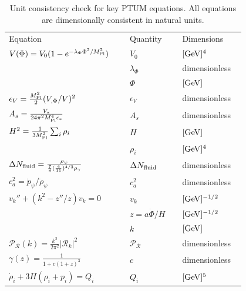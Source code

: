 \documentclass[epj]{svjour}
\begin{document}
\begin{table}[htbp]
\caption{Unit consistency check for key PTUM equations. All
equations are dimensionally consistent in natural units.}
\label{tab:units}
\centering
\footnotesize
\begin{tabular}{@{}>{\raggedright\arraybackslash}p{0.46\linewidth}>{\raggedright\arraybackslash}p{0.20\linewidth}>{\raggedright\arraybackslash}p{0.24\linewidth}@{}}
\hline\noalign{\smallskip}
Equation & Quantity & Dimensions \\
\noalign{\smallskip}\hline\noalign{\smallskip}
\(V(\Phi) = V_0(1-e^{-\lambda_\Phi\Phi^2/M_{\rm Pl}^2})\) & \(V_0\) & \([{\rm GeV}]^4\) \\
& \(\lambda_\Phi\) & dimensionless \\
& \(\Phi\) & \([{\rm GeV}]\) \\
\noalign{\smallskip}\hline\noalign{\smallskip}
\(\epsilon_V = \frac{M_{\rm Pl}^2}{2}(V_{,\Phi}/V)^2\) & \(\epsilon_V\) & dimensionless \\
\noalign{\smallskip}\hline\noalign{\smallskip}
\(A_s = \frac{V_*}{24\pi^2 M_{\rm Pl}^4 \epsilon_*}\) & \(A_s\) & dimensionless \\
\noalign{\smallskip}\hline\noalign{\smallskip}
\(H^2 = \frac{1}{3M_{\rm Pl}^2}\sum_i \rho_i\) & \(H\) & \([{\rm GeV}]\) \\
& \(\rho_i\) & \([{\rm GeV}]^4\) \\
\noalign{\smallskip}\hline\noalign{\smallskip}
\(\Delta N_{\rm fluid} = \frac{\rho_\psi}{\frac{7}{8}(\frac{4}{11})^{4/3}\rho_\gamma}\) & \(\Delta N_{\rm fluid}\) & dimensionless \\
\noalign{\smallskip}\hline\noalign{\smallskip}
\(c_a^2 = \dot p_\psi/\dot\rho_\psi\) & \(c_a^2\) & dimensionless \\
\noalign{\smallskip}\hline\noalign{\smallskip}
\(v_k'' + (k^2 - z''/z)v_k = 0\) & \(v_k\) & \([{\rm GeV}]^{-1/2}\) \\
& \(z = a\dot\Phi/H\) & \([{\rm GeV}]^{-1/2}\) \\
& \(k\) & \([{\rm GeV}]\) \\
\noalign{\smallskip}\hline\noalign{\smallskip}
\(\mathcal{P}_{\mathcal{R}}(k) = \frac{k^3}{2\pi^2}|\mathcal{R}_k|^2\) & \(\mathcal{P}_{\mathcal{R}}\) & dimensionless \\
\noalign{\smallskip}\hline\noalign{\smallskip}
\(\gamma(z) = \frac{1}{1+c(1+z)^3}\) & \(c\) & dimensionless \\
\noalign{\smallskip}\hline\noalign{\smallskip}
\(\dot\rho_i + 3H(\rho_i+p_i) = Q_i\) & \(Q_i\) & \([{\rm GeV}]^5\) \\

\end{tabular}
\end{table}
\end{document}
